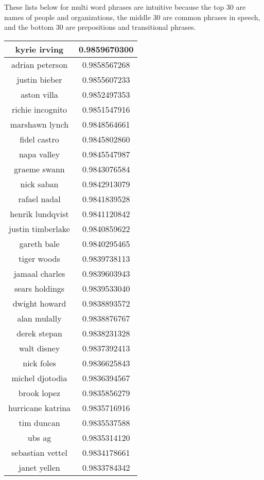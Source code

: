 \documentclass{article}
\begin{document}
These lists below for multi word phrases are intuitive because the top 30 are names of people and organizations, the middle 30 are common phrases in speech, and the bottom 30 are prepositions and transitional phrases.
\begin{table}[ht]
\parbox{.16\linewidth}{
\centering
\begin{tabular}{|c|c|}
\hline
kyrie irving & 0.9859670300\\
\hline
adrian peterson & 0.9858567268\\
\hline
justin bieber & 0.9855607233\\
\hline
aston villa & 0.9852497353\\
\hline
richie incognito & 0.9851547916\\
\hline
marshawn lynch & 0.9848564661\\
\hline
fidel castro & 0.9845802860\\
\hline
napa valley & 0.9845547987\\
\hline
graeme swann & 0.9843076584\\
\hline
nick saban & 0.9842913079\\
\hline
rafael nadal & 0.9841839528\\
\hline
henrik lundqvist & 0.9841120842\\
\hline
justin timberlake & 0.9840859622\\
\hline
gareth bale & 0.9840295465\\
\hline
tiger woods & 0.9839738113\\
\hline
jamaal charles & 0.9839603943\\
\hline
sears holdings & 0.9839533040\\
\hline
dwight howard & 0.9838893572\\
\hline
alan mulally & 0.9838876767\\
\hline
derek stepan & 0.9838231328\\
\hline
walt disney & 0.9837392413\\
\hline
nick foles & 0.9836625843\\
\hline
michel djotodia & 0.9836394567\\
\hline
brook lopez & 0.9835856279\\
\hline
hurricane katrina & 0.9835716916\\
\hline
tim duncan & 0.9835537588\\
\hline
ubs ag & 0.9835314120\\
\hline
sebastian vettel & 0.9834178661\\
\hline
janet yellen & 0.9833784342\\

\end{tabular}}
\end{table}
\end{document}
